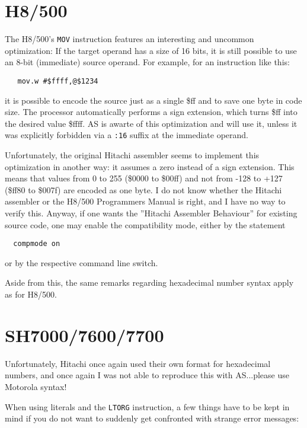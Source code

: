 \documentclass[12pt,twoside]{report}
\newcommand{\tty}[1]{{\tt #1}}
\begin{document}

\section{H8/500}

The H8/500's {\tt MOV} instruction features an interesting and uncommon
optimization: If the target operand has a size of 16 bits, it is still possible
to use an 8-bit (immediate) source operand.  For example, for an instruction
like this:
\begin{verbatim}
   mov.w #$ffff,@$1234
\end{verbatim}
it is possible to encode the source just as a single \$ff and to save one
byte in code size.  The processor automatically performs a sign extension,
which turns \$ff into the desired value \$ffff.  AS is awarte of this
optimization and will use it, unless it was explicitly forbidden via a \tty{:16}
suffix at the immediate operand.

Unfortunately, the original Hitachi assembler seems to implement this optimization
in another way: it assumes a zero instead of a sign extension.  This means that
values from 0 to 255 (\$0000 to \$00ff) and not from -128 to +127 (\$ff80 to
\$007f) are encoded as one byte.  I do not know whether the Hitachi assembler
or the H8/500 Programmers Manual is right, and I have no way to verify this.
Anyway, if one wants the ''Hitachi Assembler Behaviour'' for existing source
code, one may enable the compatibility mode, either by the statement
\begin{verbatim}
  compmode on
\end{verbatim}
or by the respective command line switch.

Aside from this, the same remarks regarding hexadecimal number syntax apply
as for H8/500.


\section{SH7000/7600/7700}

Unfortunately, Hitachi once again used their own format for
hexadecimal numbers, and once again I was not able to reproduce this
with AS...please use Motorola syntax!

When using literals and the \tty{LTORG} instruction, a few things have to
be kept in mind if you do not want to suddenly get confronted with strange
error messages:
\end{document}
